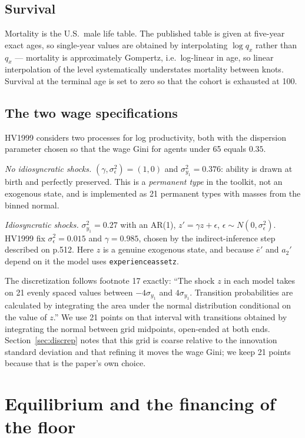 \documentclass[11pt,fleqn]{article}
\begin{document}
\subsection*{Survival}

Mortality is the U.S.\ male life table. The published table is given at five-year exact ages,
so single-year values are obtained by interpolating $\log q_x$ rather than $q_x$ --- mortality
is approximately Gompertz, i.e.\ log-linear in age, so linear interpolation of the level
systematically understates mortality between knots. Survival at the terminal age is set to
zero so that the cohort is exhausted at 100.

\subsection*{The two wage specifications}\label{sec:wage}

HV1999 considers two processes for log productivity, both with the dispersion parameter chosen
so that the wage Gini for agents under 65 equals $0.35$.

\emph{No idiosyncratic shocks.} $(\gamma,\sigma_\epsilon^2)=(1,0)$ and
$\sigma_{y_1}^2=0.376$: ability is drawn at birth and perfectly preserved. This is a
\emph{permanent type} in the toolkit, not an exogenous state, and is implemented as 21
permanent types with masses from the binned normal.

\emph{Idiosyncratic shocks.} $\sigma_{y_1}^2=0.27$ with an AR(1),
$z' = \gamma z + \epsilon$, $\epsilon\sim N(0,\sigma_\epsilon^2)$. HV1999 fix
$\sigma_\epsilon^2=0.015$ and $\gamma=0.985$, chosen by the indirect-inference step described
on p.512. Here $z$ is a genuine exogenous state, and because $\bar{e}'$ and $a_2'$ depend on
it the model uses \texttt{experienceassetz}.

The discretization follows footnote 17 exactly: ``The shock $z$ in each model takes on 21
evenly spaced values between $-4\sigma_{y_1}$ and $4\sigma_{y_1}$. Transition probabilities
are calculated by integrating the area under the normal distribution conditional on the value
of $z$.'' We use 21 points on that interval with transitions obtained by integrating the
normal between grid midpoints, open-ended at both ends. Section~\ref{sec:discrep} notes that
this grid is coarse relative to the innovation standard deviation and that refining it moves
the wage Gini; we keep 21 points because that is the paper's own choice.

\section{Equilibrium and the financing of the floor}\label{sec:ge}
\end{document}
